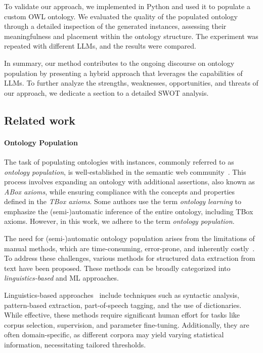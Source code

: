 %

To validate our approach, we implemented \llmfkg{} in Python and used it to populate a custom \gls{OWL} ontology.
%
We evaluated the quality of the populated ontology through a detailed inspection of the generated instances, assessing their meaningfulness and placement within the ontology structure.
%
The experiment was repeated with different \glspl{LLM}, and the results were compared.


In summary, our method contributes to the ongoing discourse on ontology population by presenting a hybrid approach that leverages the capabilities of \glspl{LLM}.
%
To further analyze the strengths, weaknesses, opportunities, and threats of our approach, we dedicate a section to a detailed \gls{SWOT} analysis.


\subsection{Related work}
\label{subsec:related-work-kgfiller}

\paragraph{Ontology Population}
\label{par:related-workd-ontology-population}
%
The task of populating ontologies with instances, commonly referred to as \emph{ontology population}, is well-established in the semantic web community~\cite{lubani-2019}.
%
This process involves expanding an ontology with additional assertions, also known as \emph{ABox axioms}, while ensuring compliance with the concepts and properties defined in the \emph{TBox axioms}.
%
Some authors use the term \emph{ontology learning} to emphasize the (semi-)automatic inference of the entire ontology, including TBox axioms.
%
However, in this work, we adhere to the term \emph{ontology population}.


The need for (semi-)automatic ontology population arises from the limitations of manual methods, which are time-consuming, error-prone, and inherently costly~\cite{cherifa-2021}.
%
To address these challenges, various methods for structured data extraction from text have been proposed.
%
These methods can be broadly categorized into \emph{linguistics-based} and \gls{ML} approaches.


Linguistics-based approaches~\cite{finkestein-1999,morin-1999,harith-2003} include techniques such as syntactic analysis, pattern-based extraction, part-of-speech tagging, and the use of dictionaries.
%
While effective, these methods require significant human effort for tasks like corpus selection, supervision, and parameter fine-tuning.
%
Additionally, they are often domain-specific, as different corpora may yield varying statistical information, necessitating tailored thresholds.


